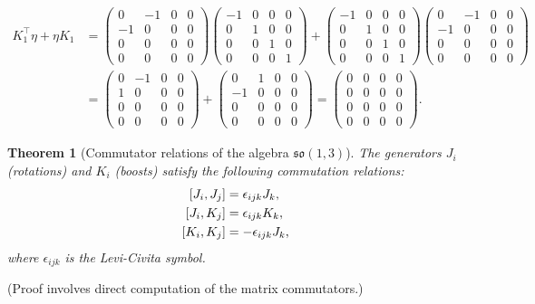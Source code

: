 \documentclass{amsart}
\newtheorem{theorem}{Theorem}[section]
\theoremstyle{definition}
\theoremstyle{remark}
\begin{document}
\begin{align*}
  K_1^\top \eta + \eta K_1 &=
  \begin{pmatrix} 0&-1&0&0 \\ -1&0&0&0 \\ 0&0&0&0 \\ 0&0&0&0 \end{pmatrix}
  \begin{pmatrix} -1&0&0&0 \\ 0&1&0&0 \\ 0&0&1&0 \\ 0&0&0&1 \end{pmatrix}
  +
  \begin{pmatrix} -1&0&0&0 \\ 0&1&0&0 \\ 0&0&1&0 \\ 0&0&0&1 \end{pmatrix}
  \begin{pmatrix} 0&-1&0&0 \\ -1&0&0&0 \\ 0&0&0&0 \\ 0&0&0&0 \end{pmatrix} \\
  &=
  \begin{pmatrix} 0&-1&0&0 \\ 1&0&0&0 \\ 0&0&0&0 \\ 0&0&0&0 \end{pmatrix}
  +
  \begin{pmatrix} 0&1&0&0 \\ -1&0&0&0 \\ 0&0&0&0 \\ 0&0&0&0 \end{pmatrix}
  =
  \begin{pmatrix} 0&0&0&0 \\ 0&0&0&0 \\ 0&0&0&0 \\ 0&0&0&0 \end{pmatrix}.
\end{align*}

\begin{theorem}[Commutator relations of the algebra $\mathfrak{so}(1,3)$]\label{thm:so13_algebra_commutation_relations}
  The generators $J_i$ (rotations) and $K_i$ (boosts) satisfy the following commutation relations:
  \begin{align*}
    \relax [J_i, J_j] &= \epsilon_{ijk} J_k, \\
    \relax [J_i, K_j] &= \epsilon_{ijk} K_k, \\
    \relax [K_i, K_j] &= -\epsilon_{ijk} J_k,
  \end{align*}
  where $\epsilon_{ijk}$ is the Levi-Civita symbol.
\end{theorem}
(Proof involves direct computation of the matrix commutators.)
\end{document}

